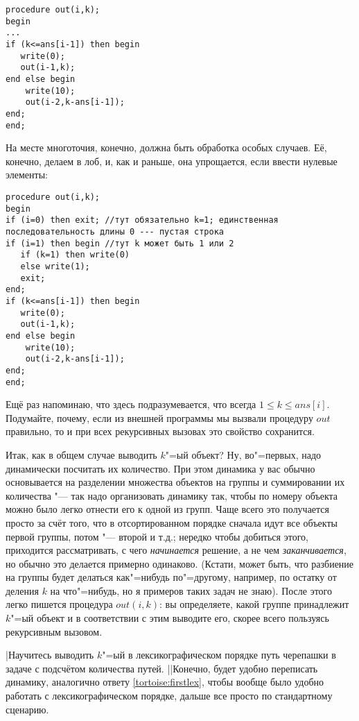 \begin{codesampleo}\begin{verbatim}
procedure out(i,k);
begin
...
if (k<=ans[i-1]) then begin
   write(0);
   out(i-1,k);
end else begin
    write(10);
    out(i-2,k-ans[i-1]);
end;
end;
\end{verbatim}\end{codesampleo}

На месте многоточия, конечно, должна быть обработка особых случаев. Её, конечно, делаем в лоб,
и, как и раньше, она упрощается, если ввести нулевые элементы:

\begin{codesampleo}\begin{verbatim}
procedure out(i,k);
begin
if (i=0) then exit; //тут обязательно k=1; единственная последовательность длины 0 --- пустая строка
if (i=1) then begin //тут k может быть 1 или 2
   if (k=1) then write(0)
   else write(1);
   exit;
end;
if (k<=ans[i-1]) then begin
   write(0);
   out(i-1,k);
end else begin
    write(10);
    out(i-2,k-ans[i-1]);
end;
end;
\end{verbatim}\end{codesampleo}
Ещё раз напоминаю, что здесь подразумевается, что всегда $1\leq k\leq ans[i]$. Подумайте,
почему, если из внешней программы мы вызвали процедуру $out$ правильно, то и при всех 
рекурсивных вызовах это свойство сохранится.

Итак, как в общем случае выводить $k$"=ый объект? Ну, во"=первых, надо динамически посчитать 
их количество. При этом динамика у вас обычно основывается на разделении множества объектов на группы и суммировании их количества "--- так надо организовать динамику так, чтобы по номеру
объекта можно было легко отнести его к одной из групп. Чаще всего это получается просто за счёт того, что в отсортированном порядке сначала идут все объекты первой группы, потом "--- второй
и т.д.; нередко чтобы добиться этого, приходится рассматривать, с чего \textit{начинается}
решение, а не чем \textit{заканчивается}, но обычно это делается примерно одинаково.
(Кстати, может быть, что разбиение на группы будет делаться как"=нибудь по"=другому,
например, по остатку от деления $k$ на что"=нибудь, но я примеров таких задач не знаю).
После этого легко пишется процедура $out(i,k)$: вы определяете, какой группе принадлежит
$k$"=ый объект и в соответствии с этим выводите его, скорее всего пользуясь рекурсивным вызовом.

\task|Научитесь выводить $k$"=ый в лексикографическом порядке путь черепашки в задаче с подсчётом 
количества путей.
||Конечно, будет удобно переписать динамику, аналогично ответу \ref{tortoise:firstlex}, 
чтобы вообще было удобно работать с лексикографическом порядке, дальше все просто по стандартному 
сценарию.

